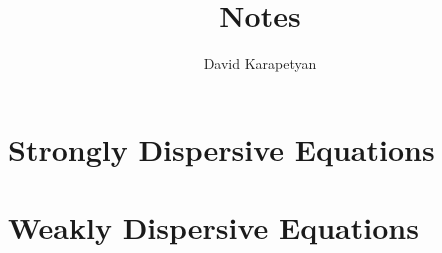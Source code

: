 \documentclass[12pt,reqno]{amsbook}
\numberwithin{section}{chapter}
\numberwithin{equation}{section}  %
\theoremstyle{remark}
\begin{document}
\title{Notes}
\author{David Karapetyan}

\date{}

\maketitle
\tableofcontents
\part{Strongly Dispersive Equations}







\part{Weakly Dispersive Equations}


\appendix
\end{document}
